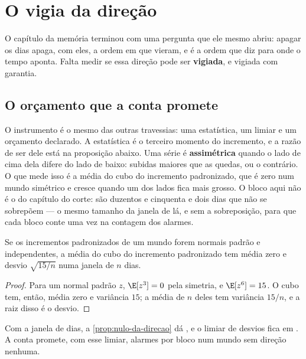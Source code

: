 \chapter{O vigia da direção}\label{cap:direcao}

O capítulo da memória terminou com uma pergunta que ele mesmo abriu: apagar os dias apaga, com eles,
a ordem em que vieram, e é a ordem que diz para onde o tempo aponta. Falta medir se essa direção pode
ser \textbf{vigiada}, e vigiada com garantia.

\section{O orçamento que a conta promete}

O instrumento é o mesmo das outras travessias: uma estatística, um limiar e um orçamento declarado\cite{gallavotti1995dynamical,godreche2018characterising,roldan2017statistics}. A
estatística é o terceiro momento do incremento, e a razão de ser dele está na proposição abaixo.
Uma série é \textbf{assimétrica} quando o lado de cima dela difere do lado de baixo: subidas maiores
que as quedas, ou o contrário. O que mede isso é a média do cubo do incremento padronizado, que é
zero num mundo simétrico e cresce quando um dos lados fica mais grosso. O bloco aqui não é o do
capítulo do corte: são duzentos e cinquenta e dois dias que não se sobrepõem --- o mesmo tamanho da janela de lá, e sem
a sobreposição, para que cada bloco conte uma vez na contagem dos alarmes.

\begin{proposicao}\label{prop:nulo-da-direcao}
Se os incrementos padronizados de um mundo forem normais padrão e independentes, a média do cubo do
incremento padronizado tem média zero e desvio $\sqrt{15/n}$ numa janela de $n$ dias.
\end{proposicao}

\begin{proof}
Para um normal padrão $z$, $\E[z^3] = 0$ pela simetria, e $\E[z^6] = 15$. O cubo tem, então, média
zero e variância $15$; a média de $n$ deles tem variância $15/n$, e a raiz disso é o desvio.
\end{proof}

Com a janela de \numDirecaoJanela{} dias, a \cref{prop:nulo-da-direcao} dá \numDirecaoConta{}, e o limiar de
\numDirecaoZ{} desvios fica em \numDirecaoLimiar{}. A conta promete, com esse limiar,
\numDirecaoContaTaxa{} alarmes por bloco num mundo sem direção nenhuma.

